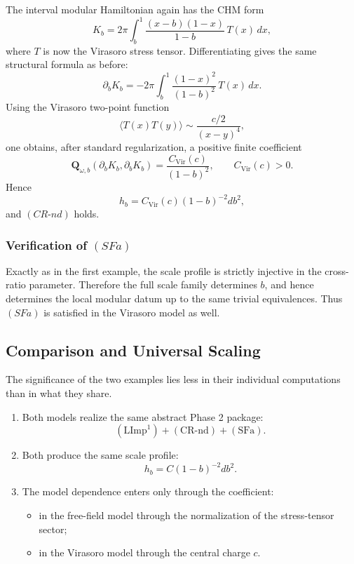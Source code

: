\documentclass[12pt]{article}
\theoremstyle{definition}
\theoremstyle{remark}
\newcommand{\tightlist}{%
  \setlength{\itemsep}{0pt}\setlength{\parskip}{0pt}}
\begin{document}
The interval modular Hamiltonian again has the CHM form \[
K_b
=
2\pi\int_b^1
\frac{(x-b)(1-x)}{1-b}\,
T(x)\,dx,
\] where \(T\) is now the Virasoro stress tensor. Differentiating gives
the same structural formula as before: \[
\partial_b K_b
=
-2\pi\int_b^1
\frac{(1-x)^2}{(1-b)^2}\,
T(x)\,dx.
\] Using the Virasoro two-point function \[
\langle T(x)T(y)\rangle\sim \frac{c/2}{(x-y)^4},
\] one obtains, after standard regularization, a positive finite
coefficient \[
\mathbf{Q}_{\omega,b}(\partial_b K_b,\partial_b K_b)
=
\frac{C_{\mathrm{Vir}}(c)}{(1-b)^2},
\qquad
C_{\mathrm{Vir}}(c)>0.
\] Hence \[
h_b
=
C_{\mathrm{Vir}}(c)(1-b)^{-2}db^2,
\] and \((CR\text{-}nd)\) holds.

\subsubsection{\texorpdfstring{Verification of
\((SFa)\)}{Verification of (SFa)}}\label{verification-of-sfa-1}

Exactly as in the first example, the scale profile is strictly injective
in the cross-ratio parameter. Therefore the full scale family determines
\(b\), and hence determines the local modular datum up to the same
trivial equivalences. Thus \((SFa)\) is satisfied in the Virasoro model
as well.

\subsection{Comparison and Universal
Scaling}\label{comparison-and-universal-scaling}

The significance of the two examples lies less in their individual
computations than in what they share.

\begin{enumerate}
\def\labelenumi{\arabic{enumi}.}
\tightlist
\item
  Both models realize the same abstract Phase 2 package: \[
  (\mathrm{LImp}^1)+(\mathrm{CR\text{-}nd})+(\mathrm{SFa}).
  \]
\item
  Both produce the same scale profile: \[
  h_b=C(1-b)^{-2}db^2.
  \]
\item
  The model dependence enters only through the coefficient:

  \begin{itemize}
  \tightlist
  \item
    in the free-field model through the normalization of the
    stress-tensor sector;
  \item
    in the Virasoro model through the central charge \(c\).
  \end{itemize}
\end{enumerate}
\end{document}

